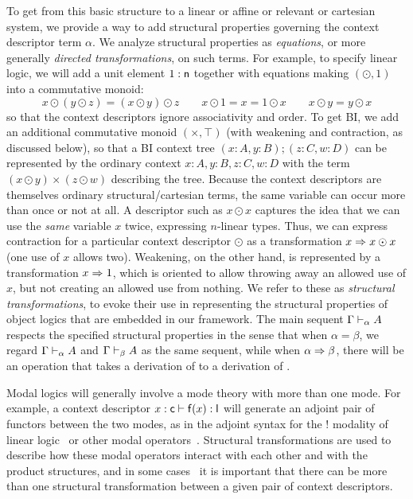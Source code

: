 To get from this basic structure to a linear or affine or relevant or
cartesian system, we provide a way to add structural properties governing
the context descriptor term $\alpha$.  We analyze structural properties
as \emph{equations}, or more generally \emph{directed transformations},
on such terms.  For example, to specify linear logic, we will add a unit
element $1 : \mathsf{n}$ together with equations making $(\odot,1)$ into a
commutative monoid:
\[
x \odot (y \odot z) = (x \odot y) \odot z \qquad
x \odot 1 = x = 1 \odot x \qquad
x \odot y = y \odot x 
\]
so that the context descriptors ignore associativity and order.  To get
BI, we add an additional commutative monoid $(\times,\top)$ (with
weakening and contraction, as discussed below), so that a BI context
tree $(x:A,y:B);(z:C,w:D)$ can be represented by the ordinary context
$x:A,y:B,z:C,w:D$ with the term $(x \odot y) \times (z \odot w)$
describing the tree.  Because the context descriptors are themselves
ordinary structural/cartesian terms, the same variable can occur more
than once or not at all.  A descriptor such as $x \odot x$ captures the
idea that we can use the \emph{same} variable $x$ twice, expressing
$n$-linear types.  Thus, we can express contraction for a particular
context descriptor $\odot$ as a transformation $x \Rightarrow x \odot x$ (one
use of $x$ allows two).  Weakening, on the other hand, is represented by
a transformation $x \Rightarrow 1$, which is oriented to allow throwing away an
allowed use of $x$, but not creating an allowed use from nothing.  We
refer to these as \emph{structural transformations}, to evoke their use
in representing the structural properties of object logics that are
embedded in our framework.  The main sequent $\Gamma \vdash_{\alpha} A$
respects the specified structural properties in the sense that when
$\alpha = \beta$, we regard $\Gamma \vdash_{\alpha} A$ and
$\Gamma \vdash_{\beta} A$ as the same sequent, while when $\alpha \Rightarrow
\beta$, there will be an operation that takes a derivation of
 to a derivation of .

Modal logics will generally involve a mode theory with more than one
mode.  For example, a context descriptor $x : \mathsf{c} \vdash \mathsf{f}(x)
: \mathsf{l}$ will generate an adjoint pair of functors between the two
modes, as in the adjoint syntax for the $!$ modality of linear
logic~\citep{bentonwadler96adjoint} or other modal
operators~\citep{reed09adjoint}.  Structural transformations are used to
describe how these modal operators interact with each other and with the
product structures, and in some cases~\citep{ls16adjoint} it is
important that there can be more than one structural transformation
between a given pair of context descriptors.

